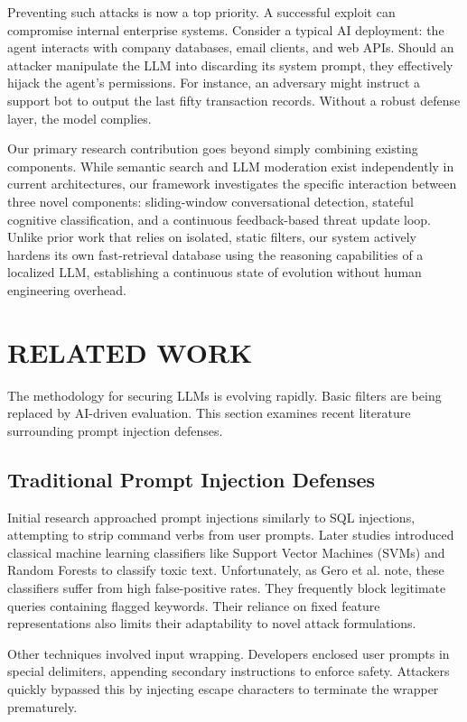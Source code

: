 \documentclass[10pt, conference]{IEEEtran}
\begin{document}
Preventing such attacks is now a top priority. A successful exploit can compromise internal enterprise systems. Consider a typical AI deployment: the agent interacts with company databases, email clients, and web APIs. Should an attacker manipulate the LLM into discarding its system prompt, they effectively hijack the agent's permissions. For instance, an adversary might instruct a support bot to output the last fifty transaction records. Without a robust defense layer, the model complies. 

Our primary research contribution goes beyond simply combining existing components. While semantic search and LLM moderation exist independently in current architectures, our framework investigates the specific interaction between three novel components: sliding-window conversational detection, stateful cognitive classification, and a continuous feedback-based threat update loop. Unlike prior work that relies on isolated, static filters, our system actively hardens its own fast-retrieval database using the reasoning capabilities of a localized LLM, establishing a continuous state of evolution without human engineering overhead.

\section{RELATED WORK}
The methodology for securing LLMs is evolving rapidly. Basic filters are being replaced by AI-driven evaluation. This section examines recent literature surrounding prompt injection defenses.

\subsection{Traditional Prompt Injection Defenses}
Initial research approached prompt injections similarly to SQL injections, attempting to strip command verbs from user prompts. Later studies introduced classical machine learning classifiers like Support Vector Machines (SVMs) and Random Forests to classify toxic text. Unfortunately, as Gero et al. \cite{gero2023llm} note, these classifiers suffer from high false-positive rates. They frequently block legitimate queries containing flagged keywords. Their reliance on fixed feature representations also limits their adaptability to novel attack formulations.

Other techniques involved input wrapping. Developers enclosed user prompts in special delimiters, appending secondary instructions to enforce safety. Attackers quickly bypassed this by injecting escape characters to terminate the wrapper prematurely.
\end{document}
